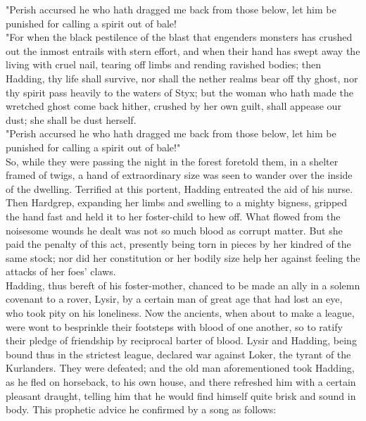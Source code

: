 \documentclass[10pt,a4paper]{report}
\begin{document}
"Perish accursed he who hath dragged me back from those below, let him be punished for calling a spirit out of bale!\\

"For when the black pestilence of the blast that engenders monsters has crushed out the inmost entrails with stern effort, and when their hand has swept away the living with cruel nail, tearing off limbs and rending ravished bodies; then Hadding, thy life shall survive, nor shall the nether realms bear off thy ghost, nor thy spirit pass heavily to the waters of Styx; but the woman who hath made the wretched ghost come back hither, crushed by her own guilt, shall appease our dust; she shall be dust herself.\\

"Perish accursed he who hath dragged me back from those below, let him be punished for calling a spirit out of bale!"\\

So, while they were passing the night in the forest foretold them, in a shelter framed of twigs, a hand of extraordinary size was seen to wander over the inside of the dwelling. Terrified at this portent, Hadding entreated the aid of his nurse. Then Hardgrep, expanding her limbs and swelling to a mighty bigness, gripped the hand fast and held it to her foster-child to hew off. What flowed from the noisesome wounds he dealt was not so much blood as corrupt matter. But she paid the penalty of this act, presently being torn in pieces by her kindred of the same stock; nor did her constitution or her bodily size help her against feeling the attacks of her foes' claws.\\

Hadding, thus bereft of his foster-mother, chanced to be made an ally in a solemn covenant to a rover, Lysir, by a certain man of great age that had lost an eye, who took pity on his loneliness. Now the ancients, when about to make a league, were wont to besprinkle their footsteps with blood of one another, so to ratify their pledge of friendship by reciprocal barter of blood. Lysir and Hadding, being bound thus in the strictest league, declared war against Loker, the tyrant of the Kurlanders. They were defeated; and the old man aforementioned took Hadding, as he fled on horseback, to his own house, and there refreshed him with a certain pleasant draught, telling him that he would find himself quite brisk and sound in body. This prophetic advice he confirmed by a song as follows:\\
\end{document}
